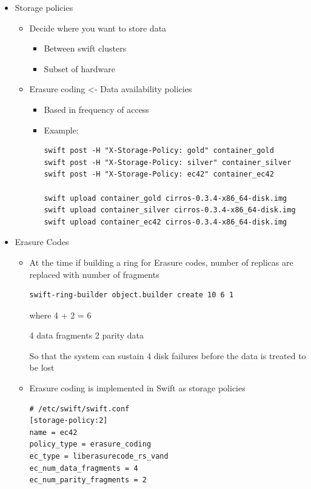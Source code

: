 \documentclass{article}
\begin{document}
\begin{itemize}
\item Storage policies
\begin{itemize}
\item Decide where you want to store data
\begin{itemize}
\item Between swift clusters
\item Subset of hardware
\end{itemize}
\item Erasure coding <- Data availability policies
\begin{itemize}
\item Based in frequency of access
\item Example:
\begin{verbatim}
swift post -H "X-Storage-Policy: gold" container_gold
swift post -H "X-Storage-Policy: silver" container_silver
swift post -H "X-Storage-Policy: ec42" container_ec42

swift upload container_gold cirros-0.3.4-x86_64-disk.img
swift upload container_silver cirros-0.3.4-x86_64-disk.img
swift upload container_ec42 cirros-0.3.4-x86_64-disk.img
\end{verbatim}
\end{itemize}
\end{itemize}

\item Erasure Codes
\begin{itemize}
\item At the time if building a ring for Erasure codes, number of
replicas are replaced with number of fragments

\begin{verbatim}
swift-ring-builder object.builder create 10 6 1
\end{verbatim}

where 4 + 2 = 6

4 data fragments
2 parity data

So that the system can sustain 4 disk failures before the data is
treated to be lost

\item Erasure coding is implemented in Swift as storage policies

\begin{verbatim}
# /etc/swift/swift.conf
[storage-policy:2]
name = ec42
policy_type = erasure_coding
ec_type = liberasurecode_rs_vand
ec_num_data_fragments = 4
ec_num_parity_fragments = 2
\end{verbatim}


\end{itemize}
\end{itemize}
\end{document}

